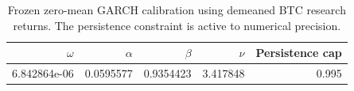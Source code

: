 \begin{table}[tbp]
\centering\small
\setlength{\tabcolsep}{4pt}
\caption{Frozen zero-mean GARCH calibration using demeaned BTC research returns. The persistence constraint is active to numerical precision.}\label{tab:data}
\begin{tabular}{rrrrr}
\toprule
$\omega$ & $\alpha$ & $\beta$ & $\nu$ & Persistence cap \\
\midrule
6.842864e-06 & 0.0595577 & 0.9354423 & 3.417848 & 0.995 \\
\bottomrule
\end{tabular}
\end{table}

